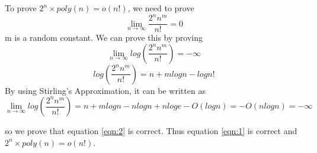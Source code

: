 \begin{solution}
    To prove $2^n \times poly(n)=o(n!)$, we need to prove
    \begin{equation}
        \label{eqn:1}
        \lim_{n \to \infty} \frac{2^nn^m}{n!} = 0
    \end{equation}
    m is a random constant. We can prove this by proving
    \begin{equation}
        \label{eqn:2}
        \lim_{n \to \infty} log(\frac{2^nn^m}{n!}) = -\infty
    \end{equation}
    $$log(\frac{2^nn^m}{n!}) = n + mlogn - logn!$$
    By using Stirling's Approximation, it can be written as
    $$\lim_{n \to \infty} log(\frac{2^nn^m}{n!}) = n + mlogn - nlogn + nloge - O(logn) = -O(nlogn) = -\infty$$
    
    so we prove that equation \ref{eqn:2} is correct. Thus equation \ref{eqn:1} is correct and $2^n \times poly(n)=o(n!)$.

\end{solution}